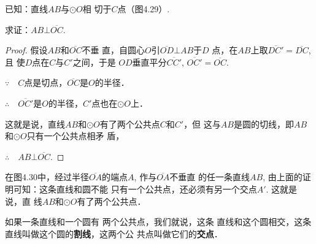 已知：直线$AB$与$\odot O$相
切于$C$点（图4.29）.

求证：$AB\bot \overline{OC}$.

\begin{proof}
    假设$AB$和$\overline{OC}$不垂
直，自圆心$O$引$\overline{OD}\bot AB$于$D$
点，在$AB$上取$\overline{DC'}=\overline{DC}$, 且
使$D$点在$C$与$C'$之间，于是
$OD$垂直平分$\overline{CC'}$, $\overline{OC'}=\overline{OC}$.

$\because\quad C$点是切点，$\overline{OC}$是$O$的半径．

$\therefore\quad \overline{OC'}$是$O$的半径，$C'$点也在$\odot O$上．

这就是说，直线$AB$和$\odot O$有了两个公共点$C$和$C'$，但
这与$AB$是圆的切线，即$AB$和$\odot O$只有一个公共点相矛
盾，

$\therefore\quad AB\bot \overline{OC}$.
\end{proof}

\begin{figure}[htp]\centering
    \begin{minipage}[t]{0.48\textwidth}
    \centering
    \caption{}
    \end{minipage}
    \begin{minipage}[t]{0.48\textwidth}
    \centering
    \caption{}
    \end{minipage}
    \end{figure}


在图4.30中，经过半径$\overline{OA}$的端点$A$, 作与$\overline{OA}$不垂直
的任一条直线$AB$, 由上面的证明可知：这条直线和圆不能
只有一个公共点，还必须有另一个交点$A'$. 这就是说，直
线$AB$和$\odot O$有了两个公共点．

如果一条直线和一个圆有
两个公共点，我们就说，这条
直线和这个圆相交，这条直线叫做这个圆的\textbf{割线}，这两个公
共点叫做它们的\textbf{交点}．

